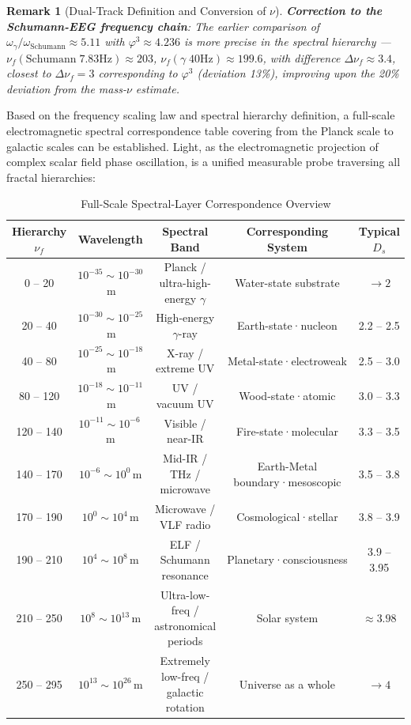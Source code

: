 \documentclass[12pt,a4paper,twocolumn]{article}
\renewcommand{\phi}{\varphi}
\newtheorem{remark}[theorem]{Remark}
\begin{document}
\begin{remark}[Dual-Track Definition and Conversion of $\nu$]
\textbf{Correction to the Schumann-EEG frequency chain}: The earlier comparison of $\omega_\gamma/\omega_{\text{Schumann}} \approx 5.11$ with $\phi^3 \approx 4.236$ is more precise in the spectral hierarchy --- $\nu_f(\text{Schumann}\;7.83\text{Hz}) \approx 203$, $\nu_f(\gamma\;40\text{Hz}) \approx 199.6$, with difference $\Delta\nu_f \approx 3.4$, closest to $\Delta\nu_f = 3$ corresponding to $\phi^3$ (deviation 13\%), improving upon the 20\% deviation from the mass-$\nu$ estimate.
\end{remark}

Based on the frequency scaling law and spectral hierarchy definition, a full-scale electromagnetic spectral correspondence table covering from the Planck scale to galactic scales can be established. Light, as the electromagnetic projection of complex scalar field phase oscillation, is a unified measurable probe traversing all fractal hierarchies:

\begin{table}[H]
\centering
\footnotesize
\caption{Full-Scale Spectral-Layer Correspondence Overview}
\label{tab:spectral_layer_overview}
\begin{tabular}{c|c|c|c|c}
\hline
\textbf{Hierarchy $\nu_f$} & \textbf{Wavelength} & \textbf{Spectral Band} & \textbf{Corresponding System} & \textbf{Typical $D_s$} \\
\hline
0 -- 20 & $10^{-35} \sim 10^{-30}$\,m & Planck / ultra-high-energy $\gamma$ & Water-state substrate & $\to 2$ \\
20 -- 40 & $10^{-30} \sim 10^{-25}$\,m & High-energy $\gamma$-ray & Earth-state·nucleon & 2.2 -- 2.5 \\
40 -- 80 & $10^{-25} \sim 10^{-18}$\,m & X-ray / extreme UV & Metal-state·electroweak & 2.5 -- 3.0 \\
80 -- 120 & $10^{-18} \sim 10^{-11}$\,m & UV / vacuum UV & Wood-state·atomic & 3.0 -- 3.3 \\
120 -- 140 & $10^{-11} \sim 10^{-6}$\,m & Visible / near-IR & Fire-state·molecular & 3.3 -- 3.5 \\
140 -- 170 & $10^{-6} \sim 10^{0}$\,m & Mid-IR / THz / microwave & Earth-Metal boundary·mesoscopic & 3.5 -- 3.8 \\
170 -- 190 & $10^{0} \sim 10^{4}$\,m & Microwave / VLF radio & Cosmological·stellar & 3.8 -- 3.9 \\
190 -- 210 & $10^{4} \sim 10^{8}$\,m & ELF / Schumann resonance & Planetary·consciousness & 3.9 -- 3.95 \\
210 -- 250 & $10^{8} \sim 10^{13}$\,m & Ultra-low-freq / astronomical periods & Solar system & $\approx 3.98$ \\
250 -- 295 & $10^{13} \sim 10^{26}$\,m & Extremely low-freq / galactic rotation & Universe as a whole & $\to 4$ \\
\hline
\end{tabular}
\end{table}
\end{document}
